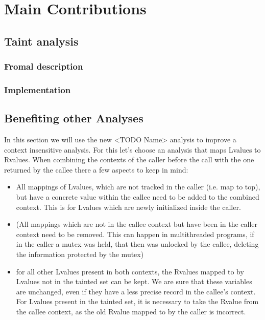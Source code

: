 
\chapter{Main Contributions}\label{chapter:mainContributions}

  \section{Taint analysis}
    
    \subsection{Fromal description}

    

    \subsection{Implementation}

  \section{Benefiting other Analyses}
  In this section we will use the new <TODO Name> analysis to improve a context insensitive analysis. For this let's choose an analysis that maps Lvalues to Rvalues.
  When combining the contexts of the caller before the call with the one returned by the callee there a few aspects to keep in mind:
  \begin{itemize}
    \item All mappings of Lvalues, which are not tracked in the caller (i.e. map to top), but have a concrete value within the callee need to be added to the combined context. This is for Lvalues which are newly initialized inside the caller.
    \item (All mappings which are not in the callee context but have been in the caller context need to be removed. This can happen in multithreaded programs, if in the caller a mutex was held, that then was unlocked by the callee, deleting the information protected by the mutex)
    \item for all other Lvalues present in both contexts, the Rvalues mapped to by Lvalues not in the tainted set can be kept. We are sure that these variables are unchanged, even if they have a less precise record in the callee's context. For Lvalues present in the tainted set, it is necessary to take the Rvalue from the callee context, as the old Rvalue mapped to by the caller is incorrect.
  \end{itemize}


